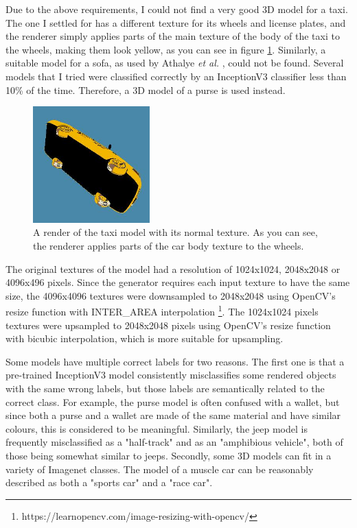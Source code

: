 Due to the above requirements, I could not find a very good 3D model for a taxi. The one I settled for has a different texture for its wheels and license plates, and the renderer simply applies parts of the main texture of the body of the taxi to the wheels, making them look yellow, as you can see in figure \ref{fig:taxi}. Similarly, a suitable model for a sofa, as used by Athalye \textit{et al.} \cite{athalye}, could not be found. Several models that I tried were classified correctly by an InceptionV3 classifier less than 10\% of the time. Therefore, a 3D model of a purse is used instead.

\begin{figure}[ht]
    \centering
    \includegraphics[width=0.4\textwidth]{graphics/taxi.jpg}
    \caption{A render of the taxi model with its normal texture. As you can see, the renderer applies parts of the car body texture to the wheels.}
    \label{fig:taxi}
\end{figure}

The original textures of the model had a resolution of 1024x1024, 2048x2048 or 4096x496 pixels. Since the generator requires each input texture to have the same size, the 4096x4096 textures were downsampled to 2048x2048 using OpenCV's resize function with INTER\_AREA interpolation \footnote{https://learnopencv.com/image-resizing-with-opencv/}. The 1024x1024 pixels textures were upsampled to 2048x2048 pixels using OpenCV's resize function with bicubic interpolation, which is more suitable for upsampling.

Some models have multiple correct labels for two reasons. The first one is that a pre-trained InceptionV3 \cite{inceptionv3} model consistently misclassifies some rendered objects with the same wrong labels, but those labels are semantically related to the correct class. For example, the purse model is often confused with a wallet, but since both a purse and a wallet are made of the same material and have similar colours, this is considered to be meaningful. Similarly, the jeep model is frequently misclassified as a "half-track" and as an "amphibious vehicle", both of those being somewhat similar to jeeps. Secondly, some 3D models can fit in a variety of Imagenet classes. The model of a muscle car can be reasonably described as both a "sports car" and a "race car".

